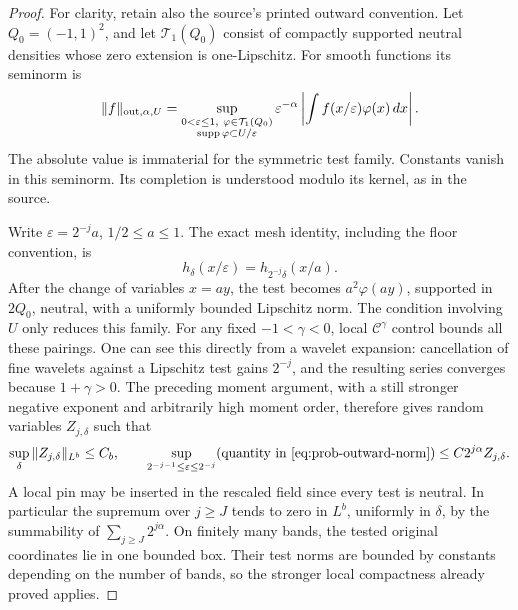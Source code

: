 \begin{proof}
For clarity, retain also the source's printed outward convention.
Let \(Q_0=(-1,1)^2\), and let \(\mathcal T_1(Q_0)\) consist of
compactly supported neutral densities whose zero extension is
one-Lipschitz. For smooth functions its seminorm is
\begin{equation}\label{eq:prob-outward-norm}
 \|f\|_{\mathrm{out},\alpha,U}
 =\sup_{\substack{0<\varepsilon\le1,\ \varphi\in\mathcal T_1(Q_0)\\
                    \operatorname{supp}\varphi\subset U/\varepsilon}}
  \varepsilon^{-\alpha}
     \left|\int f(x/\varepsilon)\varphi(x)\,dx\right|.
\end{equation}
The absolute value is immaterial for the symmetric test family.
Constants vanish in this seminorm. Its completion is understood modulo
its kernel, as in the source.

Write \(\varepsilon=2^{-j}a\), \(1/2\le a\le1\).
The exact mesh identity, including the floor convention, is
\[
 h_\delta(x/\varepsilon)=h_{2^{-j}\delta}(x/a).
\]
After the change of variables \(x=ay\), the test becomes
\(a^2\varphi(ay)\), supported in \(2Q_0\), neutral, with a uniformly
bounded Lipschitz norm. The condition involving \(U\) only reduces this
family. For any fixed \(-1<\gamma<0\), local
\(\mathcal C^\gamma\) control bounds all these pairings. One can see
this directly from a wavelet expansion: cancellation of fine wavelets
against a Lipschitz test gains \(2^{-j}\), and the resulting series
converges because \(1+\gamma>0\).
The preceding moment argument, with a still stronger negative exponent
and arbitrarily high moment order, therefore gives random variables
\(Z_{j,\delta}\) such that
\[
 \sup_\delta\|Z_{j,\delta}\|_{L^b}\le C_b,
 \qquad
 \sup_{2^{-j-1}\le\varepsilon\le2^{-j}}(\text{quantity in }
             \eqref{eq:prob-outward-norm})
       \le C2^{j\alpha}Z_{j,\delta}.
\]
A local pin may be inserted in the rescaled field since every test is
neutral. In particular the supremum over \(j\ge J\) tends to zero in
\(L^b\), uniformly in \(\delta\), by the summability of
\(\sum_{j\ge J}2^{j\alpha}\).
On finitely many bands, the tested original coordinates lie in one
bounded box. Their test norms are bounded by constants depending on the
number of bands, so the stronger local compactness already proved applies.


\end{proof}
